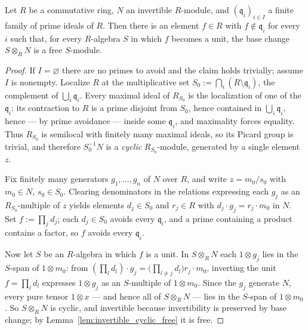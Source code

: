 \begin{theorem}
  \label{thm:invertible_avoid_free}
  \leanok
  Let \(R\) be a commutative ring, \(N\) an invertible \(R\)-module, and \((\mathfrak q_i)_{i \in I}\)
  a finite family of prime ideals of \(R\). Then there is an element \(f \in R\) with \(f \notin
  \mathfrak q_i\) for every \(i\) such that, for every \(R\)-algebra \(S\) in which \(f\) becomes a
  unit, the base change \(S \otimes_R N\) is a free \(S\)-module.
\end{theorem}
\begin{proof}
  \leanok
  If \(I = \varnothing\) there are no primes to avoid and the claim holds trivially; assume \(I\) is
  nonempty. Localize \(R\) at the multiplicative set \(S_0 := \bigcap_i (R \setminus \mathfrak q_i)\),
  the complement of \(\bigcup_i \mathfrak q_i\). Every maximal ideal of \(R_{S_0}\) is the
  localization of one of the \(\mathfrak q_i\): its contraction to \(R\) is a prime disjoint from
  \(S_0\), hence contained in \(\bigcup_i \mathfrak q_i\), hence --- by prime avoidance --- inside
  some \(\mathfrak q_i\), and maximality forces equality. Thus \(R_{S_0}\) is semilocal with finitely
  many maximal ideals, so its Picard group is trivial, and therefore \(S_0^{-1}N\) is a \emph{cyclic}
  \(R_{S_0}\)-module, generated by a single element \(z\).

  Fix finitely many generators \(g_1, \dots, g_n\) of \(N\) over \(R\), and write \(z = m_0 / s_0\)
  with \(m_0 \in N\), \(s_0 \in S_0\). Clearing denominators in the relations expressing each \(g_j\)
  as an \(R_{S_0}\)-multiple of \(z\) yields elements \(d_j \in S_0\) and \(r_j \in R\) with
  \(d_j \cdot g_j = r_j \cdot m_0\) in \(N\). Set \(f := \prod_j d_j\); each \(d_j \in S_0\) avoids
  every \(\mathfrak q_i\), and a prime containing a product contains a factor, so \(f\) avoids every
  \(\mathfrak q_i\).

  Now let \(S\) be an \(R\)-algebra in which \(f\) is a unit. In \(S \otimes_R N\) each \(1 \otimes
  g_j\) lies in the \(S\)-span of \(1 \otimes m_0\): from \((\prod_l d_l)\cdot g_j = \bigl(\prod_{l
  \ne j} d_l\bigr) r_j \cdot m_0\), inverting the unit \(f = \prod_l d_l\) expresses \(1 \otimes g_j\)
  as an \(S\)-multiple of \(1 \otimes m_0\). Since the \(g_j\) generate \(N\), every pure tensor
  \(1 \otimes x\) --- and hence all of \(S \otimes_R N\) --- lies in the \(S\)-span of \(1 \otimes
  m_0\). So \(S \otimes_R N\) is cyclic, and invertible because invertibility is preserved by base
  change; by Lemma~\ref{lem:invertible_cyclic_free} it is free.
\end{proof}

